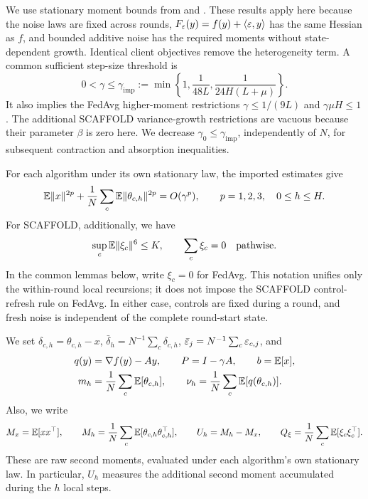 We use stationary moment bounds from \citet[Corollary~B.4 and
Lemma~B.5]{mangold2025scaffold} and \citet[Proposition~3 and
Lemmas~5--6]{mangold2025fedavg}. These results apply here because the
noise laws are fixed across rounds, $F_\varepsilon(y)=f(y)+\langle\varepsilon,y\rangle$
has the same Hessian as $f$, and bounded additive noise has the required
moments without state-dependent growth. Identical client objectives remove
the heterogeneity term. A common sufficient step-size threshold is
\begin{equation}
\label{eq:imported-step-threshold}
 0<\gamma\le\gamma_{\mathrm{imp}}
 :=\min\left\{1,\frac1{48L},\frac1{24H(L+\mu)}\right\}.
\end{equation}
It also implies the FedAvg higher-moment restrictions $\gamma\le1/(9L)$
and $\gamma\mu H\le1$. The additional SCAFFOLD variance-growth restrictions
are vacuous because their parameter $\beta$ is zero here. We decrease
$\gamma_0\le\gamma_{\mathrm{imp}}$, independently of $N$, for subsequent
contraction and absorption inequalities.

For each algorithm under its own stationary law, the imported estimates give
\begin{equation}
\label{eq:A-coarse-even}
 \mathbb{E}\|x\|^{2p}+\frac1N\sum_c\mathbb{E}\|\theta_{c,h}\|^{2p}
 =O(\gamma^p),\qquad p=1,2,3,\quad 0\le h\le H.
\end{equation}
For SCAFFOLD, additionally, we have
\begin{equation}
\label{eq:A-control-sixth}
 \sup_c\mathbb{E}\|\xi_c\|^6\le K,\qquad \sum_c\xi_c=0\quad\text{pathwise}.
\end{equation}
In the common lemmas below, write $\xi_c=0$ for FedAvg. This notation
unifies only the within-round local recursions; it does not impose the
SCAFFOLD control-refresh rule on FedAvg. In either case, controls are fixed
during a round, and fresh noise is independent of the complete round-start state.

We set $\delta_{c,h}=\theta_{c,h}-x$, $\bar\delta_h=N^{-1}\sum_c\delta_{c,h}$,
$\bar{\varepsilon}_j=N^{-1}\sum_c\varepsilon_{c,j}$, and
\begin{equation}
\label{eq:A-qP}
 \begin{aligned}
 q(y)&=\nabla f(y)-Ay,\qquad P=I-\gamma A,\qquad b=\mathbb{E}[x],\\
 m_h&=\frac1N\sum_c\mathbb{E}[\theta_{c,h}],\qquad
 \nu_h=\frac1N\sum_c\mathbb{E}[q(\theta_{c,h})].
 \end{aligned}
\end{equation}
Also, we write
\begin{equation}
\label{eq:A-MU}
 M_x=\mathbb{E}[xx^\top],\qquad M_h=\frac1N\sum_c\mathbb{E}[\theta_{c,h}\theta_{c,h}^\top],
 \qquad U_h=M_h-M_x,\qquad Q_\xi=\frac1N\sum_c\mathbb{E}[\xi_c\xi_c^\top].
\end{equation}
These are raw second moments, evaluated under each algorithm's own
stationary law. In particular, $U_h$ measures the additional second moment
accumulated during the $h$ local steps.

